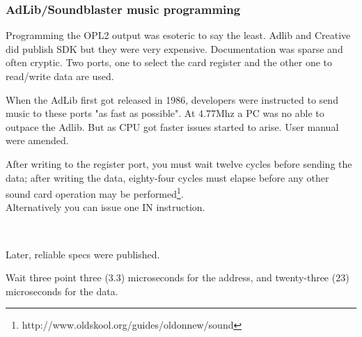 \subsubsection{AdLib/Soundblaster music programming}
\par
Programming the OPL2 output was esoteric to say the least. Adlib and Creative did publish SDK but they were very expensive. Documentation was sparse and often cryptic. Two ports, one to select the card register and the other one to read/write data are used.\\
\par
\begin{minipage}{\textwidth}

\end{minipage}
\par
When the AdLib first got released in 1986, developers were instructed to send music  to these ports "as fast as possible". At 4.77Mhz a PC was no able to outpace the Adlib. But as CPU got faster issues started to arise. User manual were amended.\\ 
\par

\begin{fancyquotes}
After writing to the register port, you must wait twelve cycles before sending the data; after writing the data, eighty-four cycles must elapse before any other sound card operation may be performed\footnote{http://www.oldskool.org/guides/oldonnew/sound}.
 \bigskip \\
 Alternatively you can issue one IN instruction.
 \bigskip \\
 \end{fancyquotes}
\\
\par
Later, reliable specs were published.\\
\par
\begin{fancyquotes}
Wait three point three (3.3) microseconds for the address, and twenty-three (23) microseconds for the data.\\
 \end{fancyquotes}
 
\par










